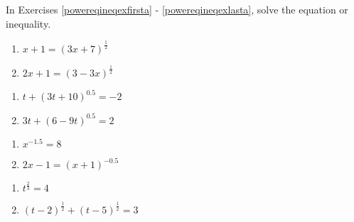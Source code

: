 \documentclass{ximera}
\begin{document}
	\author{Stitz-Zeager}



In Exercises \ref{powereqineqexfirsta} - \ref{powereqineqexlasta}, solve the equation or inequality.  


\begin{multicols}{2}
\begin{enumerate}


\item $x+1 = (3x+7)^{\frac{1}{2}}$ \label{powereqineqexfirsta}
\item  $2x+1 = (3-3x)^{\frac{1}{2}}$

\setcounter{HW}{\value{enumi}}
\end{enumerate}
\end{multicols}

\begin{multicols}{2}
\begin{enumerate}
\setcounter{enumi}{\value{HW}}


\item  $t + (3t+10)^{0.5} = -2$
\item  $3t+(6-9t)^{0.5}=2$

\setcounter{HW}{\value{enumi}}
\end{enumerate}
\end{multicols}

\begin{multicols}{2}
\begin{enumerate}
\setcounter{enumi}{\value{HW}}

\item $x^{-1.5} = 8$
\item $2x - 1 =  (x + 1)^{-0.5}$

\setcounter{HW}{\value{enumi}}
\end{enumerate}
\end{multicols}

\begin{multicols}{2}
\begin{enumerate}
\setcounter{enumi}{\value{HW}}

\item $t^{\frac{2}{3}} = 4$
\item $(t - 2)^{\frac{1}{2}} + (t - 5)^{\frac{1}{2}} = 3$

\setcounter{HW}{\value{enumi}}
\end{enumerate}
\end{multicols}
\end{document}
